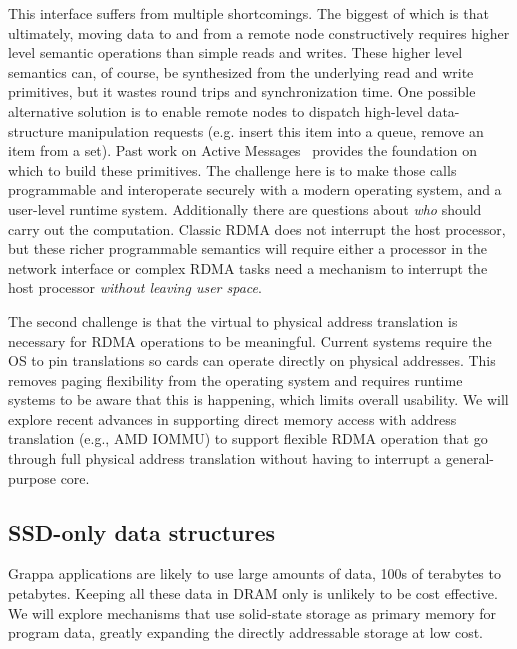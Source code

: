 This interface suffers from multiple shortcomings. The biggest of which is that ultimately, moving data to and from a remote node constructively requires higher level semantic operations than simple reads and writes. These higher level semantics can, of course, be synthesized from the underlying read and write primitives, but it wastes round trips and synchronization time. One possible alternative solution is to enable remote nodes to dispatch high-level data-structure manipulation requests (e.g. insert this item into a queue, remove an item from a set). Past work on Active Messages~\cite{vonEicken92} provides the foundation on which to build these primitives.  The challenge here is to make those calls programmable and interoperate securely with a modern operating system, and a user-level runtime system. Additionally there are questions about \emph{who} should carry out the computation. Classic RDMA does not interrupt the host processor, but these richer programmable semantics will require either a processor in the network interface or complex RDMA tasks need a mechanism to interrupt the host processor \emph{without leaving user space}.

The second challenge is that the virtual to physical address translation is necessary for RDMA operations to be meaningful. Current systems require the OS to pin translations so cards can operate directly on physical addresses. This removes paging flexibility from the operating system and requires runtime systems to be aware that this is happening, which limits overall usability. We will explore recent advances in supporting direct memory access with address translation (e.g., AMD IOMMU) to support flexible RDMA operation that go through full physical address translation without having to interrupt a general-purpose core.
 
\subsection{SSD-only data structures}

Grappa applications are likely to use large amounts of data, 100s of terabytes to petabytes. Keeping all these data in DRAM only is unlikely to be cost effective. We will explore mechanisms that use solid-state storage as primary memory for program data, greatly expanding the directly addressable storage at low cost.

